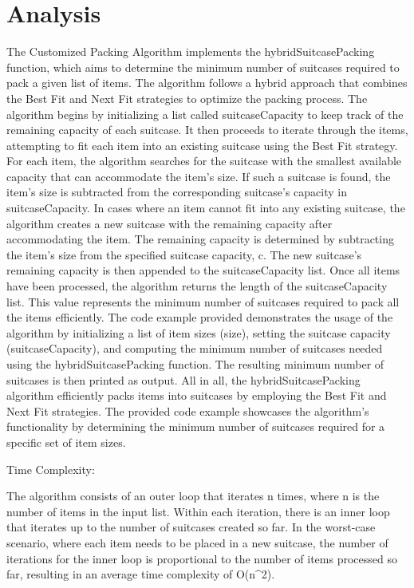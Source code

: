 \documentclass[12pt]{article}
\begin{document}
\section{Analysis}
\hspace{1cm} The Customized Packing Algorithm implements the hybridSuitcasePacking function, which aims to determine the minimum number of suitcases required to pack a given list of items. The algorithm follows a hybrid approach that combines the Best Fit and Next Fit strategies to optimize the packing process.
The algorithm begins by initializing a list called suitcaseCapacity to keep track of the remaining capacity of each suitcase. It then proceeds to iterate through the items, attempting to fit each item into an existing suitcase using the Best Fit strategy. For each item, the algorithm searches for the suitcase with the smallest available capacity that can accommodate the item's size. If such a suitcase is found, the item's size is subtracted from the corresponding suitcase's capacity in suitcaseCapacity.
In cases where an item cannot fit into any existing suitcase, the algorithm creates a new suitcase with the remaining capacity after accommodating the item. The remaining capacity is determined by subtracting the item's size from the specified suitcase capacity, c. The new suitcase's remaining capacity is then appended to the suitcaseCapacity list. Once all items have been processed, the algorithm returns the length of the suitcaseCapacity list. This value represents the minimum number of suitcases required to pack all the items efficiently. The code example provided demonstrates the usage of the algorithm by initializing a list of item sizes (size), setting the suitcase capacity (suitcaseCapacity), and computing the minimum number of suitcases needed using the hybridSuitcasePacking function. The resulting minimum number of suitcases is then printed as output.
All in all, the hybridSuitcasePacking algorithm efficiently packs items into suitcases by employing the Best Fit and Next Fit strategies. The provided code example showcases the algorithm's functionality by determining the minimum number of suitcases required for a specific set of item sizes.

\vspace{0.5cm}
\noindent Time Complexity:

\noindent The algorithm consists of an outer loop that iterates n times, where n is the number of items in the input list. Within each iteration, there is an inner loop that iterates up to the number of suitcases created so far. In the worst-case scenario, where each item needs to be placed in a new suitcase, the number of iterations for the inner loop is proportional to the number of items processed so far, resulting in an average time complexity of O(n^2). 
\end{document}
